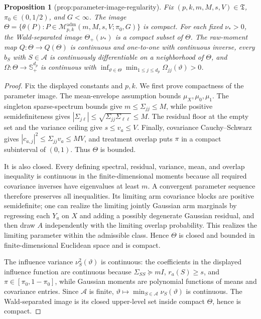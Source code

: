 \documentclass{article}
\newtheorem{proposition}{Proposition}
\begin{document}
\begin{proposition}[prop:parameter-image-regularity]\label{prop:parameter-image-regularity}
Fix \((p,k,m,M,s,V)\in\mathfrak T\), \(\pi_0\in(0,1/2)\), and \(G<\infty\). The image \(\Theta=\{\theta(P):P\in\mathcal M^{\mathrm{adm}}_{p,k}(m,M,s,V;\pi_0,G)\}\) is compact. For each fixed \(\nu_*>0\), the Wald-separated image \(\Theta_+(\nu_*)\) is a compact subset of \(\Theta\). The raw-moment map \(Q:\Theta\to Q(\Theta)\) is continuous and one-to-one with continuous inverse, every \(b_S\) with \(S\in\mathcal A\) is continuously differentiable on a neighborhood of \(\Theta\), and \(\Omega:\Theta\to\mathbb S_+^{d_p}\) is continuous with \(\inf_{\vartheta\in\Theta}\min_{1\le j\le d_p}\Omega_{jj}(\vartheta)>0\).
\end{proposition}
\begin{proof}
Fix the displayed constants and \(p,k\).  We first prove compactness of the parameter image.  The mean-envelope assumption bounds \(\mu_X,\mu_0,\mu_1\).  The singleton sparse-spectrum bounds give \(m\leq\Sigma_{jj}\leq M\), while positive semidefiniteness gives \(|\Sigma_{j\ell}|\leq\sqrt{\Sigma_{jj}\Sigma_{\ell\ell}}\leq M\).  The residual floor at the empty set and the variance ceiling give \(s\leq v_a\leq V\).  Finally, covariance Cauchy--Schwarz gives
\(|c_{a,j}|^2\leq\Sigma_{jj}v_a\leq MV\), and treatment overlap puts \(\pi\) in a compact subinterval of \((0,1)\).  Thus \(\Theta\) is bounded.

It is also closed.  Every defining spectral, residual, variance, mean, and overlap inequality is continuous in the finite-dimensional moments because all required covariance inverses have eigenvalues at least \(m\).  A convergent parameter sequence therefore preserves all inequalities.  Its limiting arm covariance blocks are positive semidefinite; one can realize the limiting jointly Gaussian arm marginals by regressing each \(Y_a\) on \(X\) and adding a possibly degenerate Gaussian residual, and then draw \(A\) independently with the limiting overlap probability.  This realizes the limiting parameter within the admissible class.  Hence \(\Theta\) is closed and bounded in finite-dimensional Euclidean space and is compact.

The influence variance \(\nu_S^2(\vartheta)\) is continuous: the coefficients in the displayed influence function are continuous because \(\Sigma_{SS}\succeq mI\), \(r_a(S)\geq s\), and \(\pi\in[\pi_0,1-\pi_0]\), while Gaussian moments are polynomial functions of means and covariance entries.  Since \(\mathcal A\) is finite,
\(\vartheta\mapsto\min_{S\in\mathcal A}\nu_S(\vartheta)\) is continuous.  The Wald-separated image is its closed upper-level set inside compact \(\Theta\), hence is compact.


\end{proof}
\end{document}
